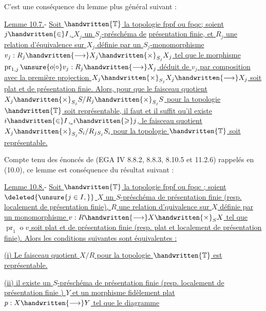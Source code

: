 C'est une conséquence du lemme plus général suivant :

\uline{Lemme 10.7.}- \uline{Soit $\handwritten{\mathbb{T}}$ la topologie fppf ou fpqc; soient $j\handwritten{\in}I$, $X_j$ un $S_j$-préschéma de}
\uline{présentation finie, et $R_j$ une relation d'équivalence sur $X_j$ définie par un $S_j$-monomorphisme $v_j:R_j\handwritten{\longrightarrow}X_j\handwritten{\times}_{S_j}X_j$ tel que le morphisme $\operatorname{pr}_{1,j}\mathbin{\unsure{o|\circ}} v_j:R_j\handwritten{\longrightarrow}X_j$ déduit de $v_j$ par composition avec la première projection $X_j\handwritten{\times}_{S_j}X_j\handwritten{\longrightarrow}X_j$ soit plat et de présentation finie. Alors, pour que le faisceau quotient $X_j\handwritten{\times}_{S_j}S/R_j\handwritten{\times}_{S_j}S$ pour la topologie $\handwritten{\mathbb{T}}$ soit représentable, il faut et il suffit qu'il existe $i\handwritten{\in}I$, $i\handwritten{\geqslant}j$, le faisceau quotient $X_j\handwritten{\times}_{S_j}S_i/R_j{}_{S_j}S_i$ pour la topologie $\handwritten{\mathbb{T}}$ soit représentable.}

Compte tenu des énoncés de (EGA IV 8.8.2, 8.8.3, 8.10.5 et 11.2.6) rappelés en (10.0), ce lemme est conséquence du résultat suivant :

\uline{Lemme 10.8.}- \uline{Soit $\handwritten{\mathbb{T}}$ la topologie fppf ou fpqc ; soient $\deleted{\unsure{j\in I,}}$ $X$ un $S$-préschéma de présentation finie (resp. localement de présentation finie), $R$ une relation d'quivalence sur $X$ définie par un monomorphisme $v:R\handwritten{\longrightarrow}X\handwritten{\times}_S X$ tel que $\operatorname{pr}_1\mathbin{o} v$ soit plat et de présentation finie (resp. plat et localement de présentation finie). Alors les conditions suivantes sont équivalentes :}

\uline{(i) Le faisceau quotient $X/R$ pour la topologie $\handwritten{\mathbb{T}}$ est représentable.}

\uline{(ii) il existe un $S$-préschéma de présentation finie (resp. localement de présentation finie ) $Y$ et un morphisme fidèlement plat $p:X\handwritten{\longrightarrow}Y$ tel que le diagramme}


